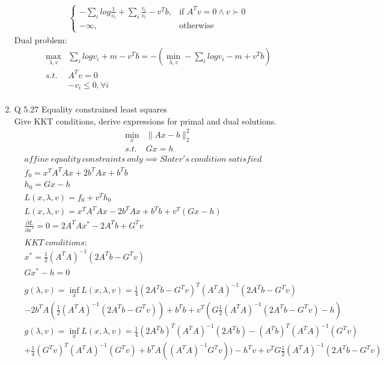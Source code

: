 \documentclass[12pt,letter]{article}
\newcommand{\norm}[1]{\|#1\|}
\begin{document}
\begin{enumerate}
\begin{align*}
\begin{cases}
        -\sum_i log \frac{1}{v_i} + \sum_i \frac{v_i}{v_i} - v^Tb, & \text{if } A^Tv=0 \wedge v \succ 0\\
        -\infty, & \text{otherwise}
      \end{cases}
  \end{align*}
  Dual problem:
  \begin{align*}
    \max_{\lambda,v} &\sum_i log v_i + m - v^Tb = -(\min_{\lambda,v}-\sum_i log v_i - m + v^Tb)\\
    s.t.\ &A^Tv = 0\\
    &-v_i \leq 0, \forall i\\
  \end{align*}
  \pagebreak
\item Q 5.27 Equality constrained least squares\\
  Give KKT conditions, derive expressions for primal and dual solutions.
  \begin{align*}
    \min_x & \norm{Ax-b}_2^2\\
    s.t.\ & Gx=h            
  \end{align*}
  \begin{align*}
    &affine\ equality\ constraints\ only \implies Slater's\ condition\ satisfied\\
    &f_0 = x^TA^TAx + 2b^TAx + b^Tb\\
    &h_0 = Gx-h\\
    &L(x,\lambda,v) = f_0 + v^Th_0\\
    &L(x,\lambda,v) = x^TA^TAx - 2b^TAx + b^Tb + v^T(Gx-h)\\
    &\frac{\partial L}{\partial x^*} = 0 = 2A^TAx^* - 2A^Tb + G^Tv\\
    \\
    &KKT\ conditions:\\
    &x^* = \frac{1}{2}(A^TA)^{-1}(2A^Tb - G^Tv)\\
    &Gx^*-h = 0\\
    \\
    &g(\lambda,v)= \inf_x L(x,\lambda,v) = \frac{1}{4}(2A^Tb-G^Tv)^T(A^TA)^{-1}(2A^Tb-G^Tv)\\
    &-2b^TA(\frac{1}{2}(A^TA)^{-1}(2A^Tb-G^Tv)) + b^Tb + v^T(G\frac{1}{2}(A^TA)^{-1}(2A^Tb-G^Tv)-h)\\
    &g(\lambda,v)= \inf_x L(x,\lambda,v) = \frac{1}{4}(2A^Tb)^T(A^TA)^{-1}(2A^Tb)-(A^Tb)^T(A^TA)^{-1}(G^Tv)\\
    &+\frac{1}{4}(G^Tv)^T(A^TA)^{-1}(G^Tv) +b^TA((A^TA)^{-1}G^Tv)) -h^Tv + v^TG\frac{1}{2}(A^TA)^{-1}(2A^Tb-G^Tv) \\

\end{align*}
\end{enumerate}
\end{document}
